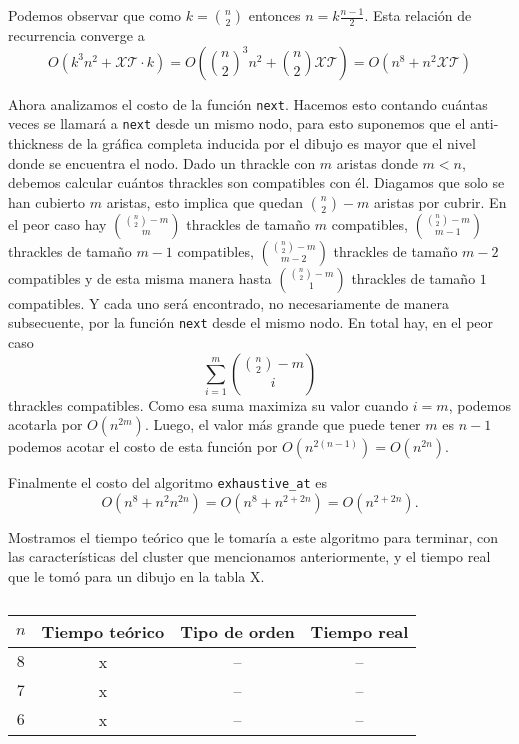   Podemos observar que como $k=\binom{n}{2}$ entonces $n = k\frac{n-1}{2}$. Esta relación de recurrencia converge a \[ O(k^3 n^2 + \mathcal{XT}\cdot k) = O\left(\binom{n}{2}^3 n^2 + \binom{n}{2}\mathcal{XT}\right) = O(n^8 + n^2\mathcal{XT})\]

  Ahora analizamos el costo de la función \texttt{next}. Hacemos esto contando cuántas veces se llamará a
  \texttt{next} desde un mismo nodo, para esto suponemos que el anti-thickness de la gráfica completa
  inducida por el dibujo es mayor que el nivel donde se encuentra el nodo. Dado un thrackle con $m$ aristas
  donde $m < n$, debemos calcular cuántos thrackles son compatibles con él. Diagamos que solo se han
  cubierto $m$ aristas, esto implica que quedan $\binom{n}{2} - m$ aristas por cubrir. En el peor caso hay
  $\binom{\binom{n}{2}-m}{m}$ thrackles de tamaño $m$ compatibles, $\binom{\binom{n}{2}-m}{m-1}$ thrackles
  de tamaño $m-1$ compatibles, $\binom{\binom{n}{2}-m}{m-2}$ thrackles de tamaño $m-2$ compatibles y de
  esta misma manera hasta $\binom{\binom{n}{2}-m}{1}$ thrackles de tamaño $1$ compatibles. Y cada uno será
  encontrado, no necesariamente de manera subsecuente, por la función \texttt{next} desde el mismo nodo. En
  total hay, en el peor caso \[ \sum_{i=1}^m \binom{\binom{n}{2}-m}{i} \] thrackles compatibles. Como esa
  suma maximiza su valor cuando $i=m$, podemos acotarla por $O(n^{2m})$. Luego, el valor más grande que
  puede tener $m$ es $n-1$ podemos acotar el costo de esta función por $O(n^{2(n-1)}) = O(n^{2n})$.

  Finalmente el costo del algoritmo \texttt{exhaustive\_at} es
  \[O(n^8 + n^2 n^{2n}) = O(n^8 + n^{2+2n}) = O (n^{2+2n}).\]

  Mostramos el tiempo teórico que le tomaría a este algoritmo para terminar, con las características del cluster que mencionamos anteriormente, y el tiempo real que le tomó para un dibujo en la tabla X.

  \begin{table}
    \begin{tabular}{|c|c|c|c|}
      \hline
      $n$ & Tiempo teórico & Tipo de orden & Tiempo real \\ \hline
      $8$ & x              & --            & --          \\ \hline
      $7$ & x              & --            & --          \\ \hline
      $6$ & x              & --            & --          \\ \hline
    \end{tabular}
    \caption{}
    \label{}

  \end{table}


